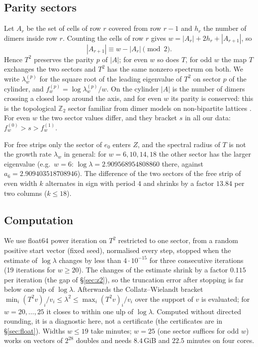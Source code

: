 \documentclass[11pt]{amsart}
\theoremstyle{definition}
\theoremstyle{remark}
\newcommand{\Z}{\mathbb{Z}}
\begin{document}
\subsection{Parity sectors}
Let $A_r$ be the set of cells of row $r$ covered from row $r - 1$ and $h_r$ the number of
dimers inside row $r$. Counting the cells of row $r$ gives $w = |A_r| + 2h_r + |A_{r+1}|$, so
\[
  |A_{r+1}| \equiv w - |A_r| \pmod 2.
\]
Hence $T^2$ preserves the parity $p$ of $|A|$; for even $w$ so does $T$, for odd $w$ the map $T$
exchanges the two sectors and $T^2$ has the same nonzero spectrum on both. We write
$\lambda^{(p)}_w$ for the square root of the leading eigenvalue of $T^2$ on sector $p$ of the
cylinder, and $f_w^{(p)} = \log \lambda^{(p)}_w / w$. On the cylinder $|A|$ is the number of
dimers crossing a closed loop around the axis, and for even $w$ its parity is conserved: this is
the topological $\Z_2$ sector familiar from dimer models on non-bipartite lattices
\cite{moessnersondhi2001,yaokivelson2012}. For even $w$ the two sector values differ, and they
bracket $s$ in all our data: $f^{(0)}_w > s > f^{(1)}_w$.

For free strips only the sector of $e_0$ enters $Z$, and the spectral radius of $T$ is not the
growth rate $\lambda_w$ in general: for $w = 6, 10, 14, 18$ the other sector has the larger
eigenvalue (e.g.\ $w = 6$: $\log\lambda = 2.909568954808860$ there, against
$a_6 = 2.909403518708946$). The difference of the two sectors of the free strip of even width
$k$ alternates in sign with period $4$ and shrinks by a factor $13.84$ per two columns
($k \le 18$).

\subsection{Computation}
We use float64 power iteration on $T^2$ restricted to one sector, from a random positive start
vector (fixed seed), normalised every step, stopped when the estimate of $\log \lambda$ changes
by less than $4\cdot10^{-15}$ for three consecutive iterations (19 iterations for $w \ge 20$).
The changes of the estimate shrink by a factor $0.115$ per iteration (the gap of
\S\ref{sec:z2}), so the truncation error after stopping is far below one ulp of $\log\lambda$.
Afterwards the Collatz--Wielandt bracket $\min_i (T^2 v)_i / v_i \le \lambda^2 \le \max_i (T^2
v)_i / v_i$ \cite{collatz1942,wielandt1950} over the support of $v$ is evaluated; for
$w = 20, \dots, 25$ it closes to within one ulp of $\log \lambda$. Computed without directed
rounding, it is a diagnostic here, not a certificate (the certificates are in
\S\ref{sec:float}). Widths $w \le 19$ take minutes; $w = 25$ (one sector suffices for odd $w$)
works on vectors of $2^{28}$ doubles and needs $8.4$\,GiB and $22.5$ minutes on four cores.
\end{document}
